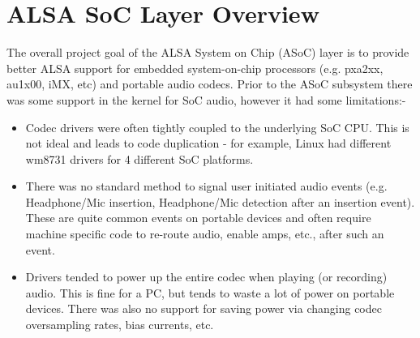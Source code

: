 \documentclass[a4paper,8pt,english]{sphinxmanual}
\begin{document}
\section{ALSA SoC Layer Overview}
\label{sound/soc/overview:alsa-soc-layer-overview}\label{sound/soc/overview::doc}
The overall project goal of the ALSA System on Chip (ASoC) layer is to
provide better ALSA support for embedded system-on-chip processors (e.g.
pxa2xx, au1x00, iMX, etc) and portable audio codecs.  Prior to the ASoC
subsystem there was some support in the kernel for SoC audio, however it
had some limitations:-
\begin{itemize}
\item {} 
Codec drivers were often tightly coupled to the underlying SoC
CPU. This is not ideal and leads to code duplication - for example,
Linux had different wm8731 drivers for 4 different SoC platforms.

\item {} 
There was no standard method to signal user initiated audio events (e.g.
Headphone/Mic insertion, Headphone/Mic detection after an insertion
event). These are quite common events on portable devices and often require
machine specific code to re-route audio, enable amps, etc., after such an
event.

\item {} 
Drivers tended to power up the entire codec when playing (or
recording) audio. This is fine for a PC, but tends to waste a lot of
power on portable devices. There was also no support for saving
power via changing codec oversampling rates, bias currents, etc.

\end{itemize}
\end{document}
